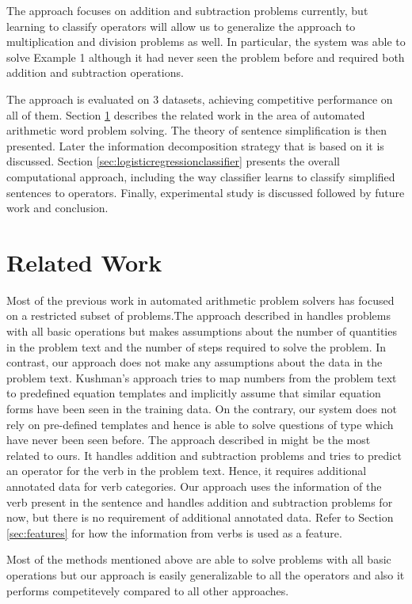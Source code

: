 \documentclass[11pt]{article}
\begin{document}
The approach focuses on addition and subtraction problems currently, but learning to classify operators will allow us to generalize the approach to multiplication and division problems as well. In particular, the system was able to solve Example 1 although it had never seen the problem before and required both addition and subtraction operations.

The approach is evaluated on 3 datasets, achieving competitive performance on all of them. Section \ref{sec:relatedwork} describes the related work in the area of automated arithmetic word problem solving. The theory of sentence simplification is then presented. Later the information decomposition strategy that is based on it is discussed. Section \ref{sec:logisticregressionclassifier} presents the overall computational approach, including the way classifier learns to classify simplified sentences to operators. Finally, experimental study is discussed followed by future work and conclusion.

\section{Related Work} \label{sec:relatedwork}
Most of the previous work in automated arithmetic problem solvers has focused on a restricted subset of problems.The approach described in \citep{RoyTACL15} handles problems with all basic operations but makes assumptions about the number of quantities in the problem text and the number of steps required to solve the problem. In contrast, our approach does not make any assumptions about the data in the problem text. Kushman's approach \citep{Kushman} tries to map numbers from the problem text to predefined equation templates and implicitly assume that similar equation forms have been seen in the training data. On the contrary, our system does not rely on pre-defined templates and hence is able to solve questions of type which have never been seen before.  The approach described in \citep{ARIS} might be the most related to ours. It handles addition and subtraction problems and tries to predict an operator for the verb in the problem text. Hence, it requires additional annotated data for verb categories. Our approach uses the information of the verb present in the sentence and handles addition and subtraction problems for now, but there is no requirement of additional annotated data. Refer to Section \ref{sec:features} for how the information from verbs is used as a feature. 

Most of the methods mentioned above are able to solve problems with all basic operations but our approach is easily generalizable to all the operators and also it performs competitevely compared to all other approaches. 
\end{document}
